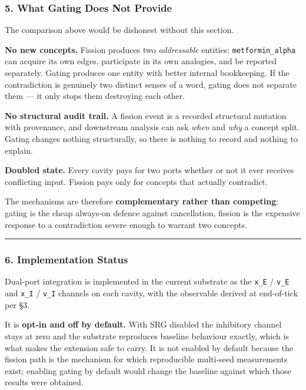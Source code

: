 \documentclass[
  11pt,
  a4paper,
]{article}
\begin{document}
\subsubsection{5. What Gating Does Not
Provide}\label{what-gating-does-not-provide}

The comparison above would be dishonest without this section.

\textbf{No new concepts.} Fission produces two \emph{addressable}
entities: \texttt{metformin\_alpha} can acquire its own edges,
participate in its own analogies, and be reported separately. Gating
produces one entity with better internal bookkeeping. If the
contradiction is genuinely two distinct senses of a word, gating does
not separate them --- it only stops them destroying each other.

\textbf{No structural audit trail.} A fission event is a recorded
structural mutation with provenance, and downstream analysis can ask
\emph{when} and \emph{why} a concept split. Gating changes nothing
structurally, so there is nothing to record and nothing to explain.

\textbf{Doubled state.} Every cavity pays for two ports whether or not
it ever receives conflicting input. Fission pays only for concepts that
actually contradict.

The mechanisms are therefore \textbf{complementary rather than
competing}: gating is the cheap always-on defence against cancellation,
fission is the expensive response to a contradiction severe enough to
warrant two concepts.

\begin{center}\rule{0.5\linewidth}{0.5pt}\end{center}

\subsubsection{6. Implementation Status}\label{implementation-status}

Dual-port integration is implemented in the current substrate as the
\texttt{x\_E} / \texttt{v\_E} and \texttt{x\_I} / \texttt{v\_I} channels
on each cavity, with the observable derived at end-of-tick per §3.

It is \textbf{opt-in and off by default.} With SRG disabled the
inhibitory channel stays at zero and the substrate reproduces baseline
behaviour exactly, which is what makes the extension safe to carry. It
is not enabled by default because the fission path is the mechanism for
which reproducible multi-seed measurements exist; enabling gating by
default would change the baseline against which those results were
obtained.
\end{document}

